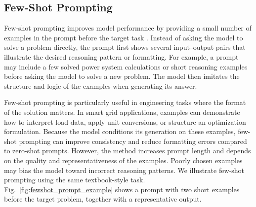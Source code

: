 \documentclass[journal,onecolumn]{IEEEtran} %
\begin{document}
\subsection{Few-Shot Prompting}
Few-shot prompting improves model performance by providing a small number of examples in the prompt before the target task \cite{brown2020gpt3}. Instead of asking the model to solve a problem directly, the prompt first shows several input--output pairs that illustrate the desired reasoning pattern or formatting. For example, a prompt may include a few solved power system calculations or short reasoning examples before asking the model to solve a new problem. The model then imitates the structure and logic of the examples when generating its answer.

Few-shot prompting is particularly useful in engineering tasks where the format of the solution matters. In smart grid applications, examples can demonstrate how to interpret load data, apply unit conversions, or structure an optimization formulation. Because the model conditions its generation on these examples, few-shot prompting can improve consistency and reduce formatting errors compared to zero-shot prompts. However, the method increases prompt length and depends on the quality and representativeness of the examples. Poorly chosen examples may bias the model toward incorrect reasoning patterns. We illustrate few-shot prompting using the same textbook-style task. Fig.~\ref{fig:fewshot_prompt_example} shows a prompt with two short examples before the target problem, together with a representative output.
\end{document}
